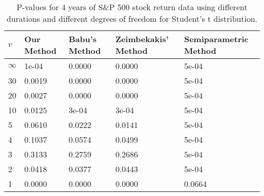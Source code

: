\begin{table}[ht]
\centering
\caption{P-values for 4 years of S\&P 500 stock return 
                   data using different durations
  and different degrees of freedom for Student's t distribution.} 
\label{table:SP5004}
\begin{tabular}{lllll}
  \hline
$v$ & Our Method & Babu's Method & Zeimbekakis' Method & Semiparametric Method \\ 
  \hline
$\infty$ & 1e-04 & 0.0000 & 0.0000 & 5e-04 \\ 
  30 & 0.0019 & 0.0000 & 0.0000 & 5e-04 \\ 
  20 & 0.0027 & 0.0000 & 0.0000 & 5e-04 \\ 
  10 & 0.0125 & 3e-04 & 3e-04 & 5e-04 \\ 
  5 & 0.0610 & 0.0222 & 0.0141 & 5e-04 \\ 
  4 & 0.1037 & 0.0574 & 0.0499 & 5e-04 \\ 
  3 & 0.3133 & 0.2759 & 0.2686 & 5e-04 \\ 
  2 & 0.0418 & 0.0377 & 0.0443 & 5e-04 \\ 
  1 & 0.0000 & 0.0000 & 0.0000 & 0.0664 \\ 
   \hline
\end{tabular}
\end{table}

